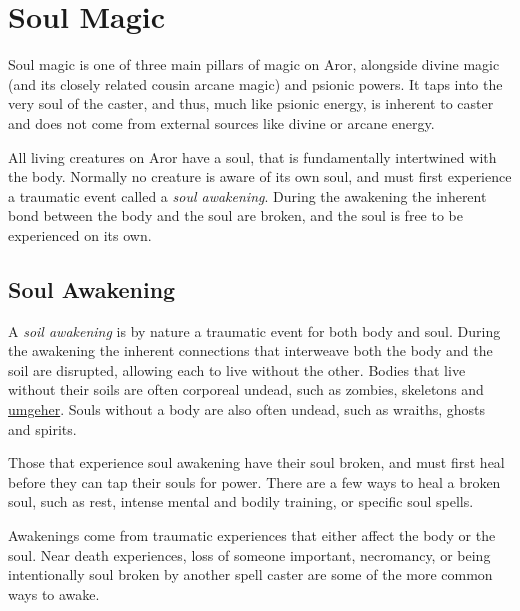 \section{Soul Magic}
\label{sec:Soul Magic}

Soul magic is one of three main pillars of magic on Aror, alongside divine
magic (and its closely related cousin arcane magic) and psionic
powers. It taps into the very soul of the caster, and thus, much like psionic
energy, is inherent to caster and does not come from external sources like
divine or arcane energy.

All living creatures on Aror have a soul, that is fundamentally intertwined
with the body. Normally no creature is aware of its own soul, and must first
experience a traumatic event called a \emph{soul awakening}. During the
awakening the inherent bond between the body and the soul are broken, and the
soul is free to be experienced on its own.

\subsection{Soul Awakening}
\label{sec:Soul Awakening}

A \emph{soil awakening} is by nature a traumatic event for both body and soul.
During the awakening the inherent connections that interweave both the body and
the soil are disrupted, allowing each to live without the other. Bodies that
live without their soils are often corporeal undead, such as zombies,
skeletons and \hyperref[sec:Umgeher]{umgeher}. Souls without a body are also
often undead, such as wraiths, ghosts and spirits.

Those that experience soul awakening have their soul broken, and must first
heal before they can tap their souls for power. There are a few ways to heal
a broken soul, such as rest, intense mental and bodily training, or specific
soul spells.

Awakenings come from traumatic experiences that either affect the body or the
soul. Near death experiences, loss of someone important, necromancy, or being
intentionally soul broken by another spell caster are some of the more common
ways to awake.


